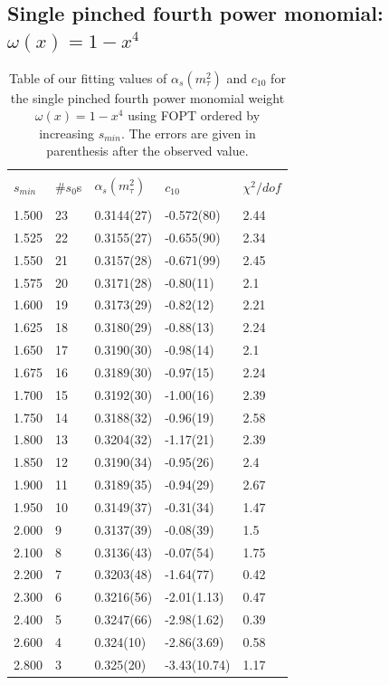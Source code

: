 \documentclass[../../index.tex]{subfiles}
\begin{document}
\subsection{Single pinched fourth power monomial: $\omega(x) = 1-x^4$}
\begin{table}[H]
  \centering
  \begin{tabular}{lllll}
    \toprule \\
    $s_{min}$ & \#$s_0$s & $\alpha_s(m_\tau^2)$ & $c_{10}$ & $\chi^2/dof$  \\
    \hline \\
    1.500 & 23 & 0.3144(27) & -0.572(80) & 2.44 \\
    1.525 & 22 & 0.3155(27) & -0.655(90) & 2.34 \\
    1.550 & 21 & 0.3157(28) & -0.671(99) & 2.45 \\
    1.575 & 20 & 0.3171(28) & -0.80(11) & 2.1 \\
    1.600 & 19 & 0.3173(29) & -0.82(12) & 2.21 \\
    1.625 & 18 & 0.3180(29) & -0.88(13) & 2.24 \\
    1.650 & 17 & 0.3190(30) & -0.98(14) & 2.1 \\
    1.675 & 16 & 0.3189(30) & -0.97(15) & 2.24 \\
    1.700 & 15 & 0.3192(30) & -1.00(16) & 2.39 \\
    1.750 & 14 & 0.3188(32) & -0.96(19) & 2.58 \\
    1.800 & 13 & 0.3204(32) & -1.17(21) & 2.39 \\
    1.850 & 12 & 0.3190(34) & -0.95(26) & 2.4 \\
    1.900 & 11 & 0.3189(35) & -0.94(29) & 2.67 \\
    1.950 & 10 & 0.3149(37) & -0.31(34) & 1.47 \\
    2.000 & 9  & 0.3137(39) & -0.08(39) & 1.5 \\
    2.100 & 8  & 0.3136(43) & -0.07(54) & 1.75 \\
    2.200 & 7  & 0.3203(48) & -1.64(77) & 0.42 \\
    2.300 & 6  & 0.3216(56) & -2.01(1.13) & 0.47 \\
    2.400 & 5  & 0.3247(66) & -2.98(1.62) & 0.39 \\
    2.600 & 4  & 0.324(10) & -2.86(3.69) & 0.58 \\
    2.800 & 3  & 0.325(20) & -3.43(10.74) & 1.17 \\
    \bottomrule
  \end{tabular}
  \caption{Table of our fitting values of $\alpha_s(m_\tau^2)$ and $c_{10}$
    for the single pinched fourth power monomial weight $\omega(x)=1-x^4$ using FOPT ordered
    by increasing $s_{min}$. The errors are given in parenthesis after the observed value.}
  \label{table:fitWCubicAlD6D8D10}
\end{table}
\end{document}
